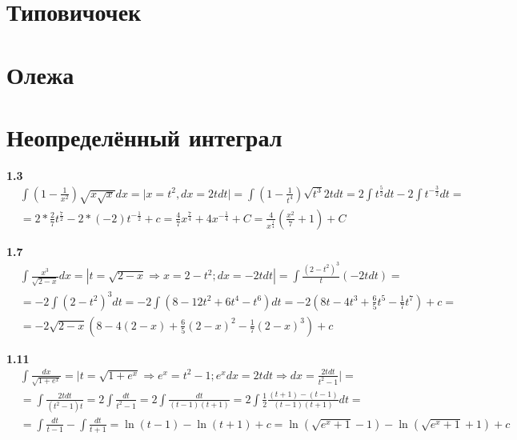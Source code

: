 \documentclass[a4paper, 12pt]{article}
\begin{document}
    \begin{center}
        \section*{Типовичочек}
        \section*{Олежа}
    \end{center}

    \newpage
    \section{Неопределённый интеграл}
    
    \textbf{1.3}
    \begin{align*}
    &\int{\left(1-\frac{1}{x^2}\right)\sqrt{x\sqrt{x}}dx} 
    = \Big|x = t^2, dx = 2tdt\Big| = 
    \int{\left(1-\frac{1}{t^4}\right)\sqrt{t^3}2tdt} = 
    2\int{t^\frac{5}{2}dt} - 2\int{t^{-\frac{3}{2}}dt} = \\
    &= 2*\frac{2}{7}t^\frac{7}{2} - 2*(-2)t^{-\frac{1}{2}} + c = 
    \frac{4}{7}x^\frac{7}{4}+4x^{-\frac{1}{4}}+C = 
    \frac{4}{x^\frac{1}{4}}\left(\frac{x^2}{7}+1\right)+C
    \end{align*}
    
    \textbf{1.7}
    \begin{align*}
    &\int{\frac{x^3}{\sqrt{2-x}}dx} 
    = |t = \sqrt{2-x} \Rightarrow x = 2-t^2; dx = -2tdt | = 
    \int{\frac{(2-t^2)^3}{t}(-2tdt)} = \\
    &= -2\int{(2-t^2)^3dt} = 
    -2\int{(8-12t^2+6t^4-t^6)dt} = -2(8t-4t^3+\frac{6}{5}t^5-\frac{1}{7}t^7)+c = \\
    &= -2\sqrt{2-x}(8-4(2-x)+\frac{6}{5}(2-x)^2-\frac{1}{7}(2-x)^3)+c
    \end{align*}
    
    \textbf{1.11}
    \begin{align*}
    &\int{\frac{dx}{\sqrt{1+e^x}}} 
    = \Big| t = \sqrt{1+e^x} \Rightarrow e^x = t^2-1; e^xdx = 2tdt \Rightarrow dx = \frac{2tdt}{t^2-1} \Big| = \\
    &= \int{\frac{2tdt}{(t^2-1)t}} = 2\int{\frac{dt}{t^2-1}} = 
    2\int{\frac{dt}{(t-1)(t+1)}} = 
    2\int{\frac{1}{2}\frac{(t+1)-(t-1)}{(t-1)(t+1)}dt} = \\
    &= \int{\frac{dt}{t-1}} - \int{\frac{dt}{t+1}} =
    \ln{(t-1)} - \ln{(t+1)} + c = 
    \ln{(\sqrt{e^x+1}-1)} - \ln{(\sqrt{e^x+1}+1)}+c
    \end{align*}
    
\end{document}
